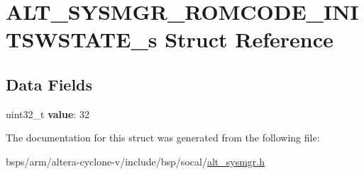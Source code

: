 \hypertarget{structALT__SYSMGR__ROMCODE__INITSWSTATE__s}{}\section{A\+L\+T\+\_\+\+S\+Y\+S\+M\+G\+R\+\_\+\+R\+O\+M\+C\+O\+D\+E\+\_\+\+I\+N\+I\+T\+S\+W\+S\+T\+A\+T\+E\+\_\+s Struct Reference}
\label{structALT__SYSMGR__ROMCODE__INITSWSTATE__s}
\subsection*{Data Fields}
\begin{DoxyCompactItemize}
\item 
\mbox{\label{structALT__SYSMGR__ROMCODE__INITSWSTATE__s_ab0cbde4455ebd4f33336b2eb4b130cbe}} 
uint32\+\_\+t {\bfseries value}\+: 32
\end{DoxyCompactItemize}


The documentation for this struct was generated from the following file\+:\begin{DoxyCompactItemize}
\item 
bsps/arm/altera-\/cyclone-\/v/include/bsp/socal/\mbox{\hyperlink{alt__sysmgr_8h}{alt\+\_\+sysmgr.\+h}}\end{DoxyCompactItemize}

